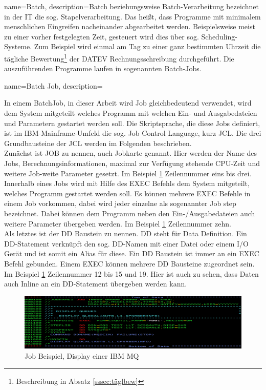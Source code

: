 \makeglossaries

{
	name=Batch,
	description={Batch beziehungsweise Batch-Verarbeitung bezeichnet in der IT die sog. \glqq Stapelverarbeitung\grqq.
Das heißt, dass Programme mit minimalem menschlichen Eingreifen nacheinander abgearbeitet werden.
Beispielsweise meist zu einer vorher festgelegten Zeit, gesteuert wird dies über sog. \glqq Scheduling\grqq-Systeme.
Zum Beispiel wird einmal am Tag zu einer ganz bestimmten Uhrzeit die tägliche Bewertung\footnote{Beschreibung in Absatz \ref{sssec:täglbew}} der DATEV Rechnungsschreibung durchgeführt.
Die auszuführenden Programme laufen in sogenannten \glqq Batch-Jobs\grqq.
\cite{Ebbers.2011}}
}

{
	name=Batch Job,
	description={In einem Batch\-Job, in dieser Arbeit wird \glqq Job\grqq{} gleichbedeutend verwendet, wird dem System mitgeteilt welches Programm mit welchen Ein- und Ausgabedateien und Parametern gestartet werden soll.
Die Skriptsprache, die diese Jobs definiert, ist im IBM-Mainframe-Umfeld die sog. \glqq Job Control Language\grqq, kurz JCL.
Die drei Grundbausteine der JCL werden im Folgenden beschrieben.\\
Zunächst ist \glqq JOB\grqq{} zu nennen, auch Jobkarte genannt.
Hier werden der Name des Jobs, Berechnungsinformationen, maximal zur Verfügung stehende CPU-Zeit und weitere Job-weite Parameter gesetzt.
Im Beispiel \ref{fig:jclBsp} Zeilennummer eins bis drei.\\
Innerhalb eines Jobs wird mit Hilfe des \glqq EXEC\grqq{} Befehls dem System mitgeteilt, welches Programm gestartet werden soll.
Es können mehrere \glqq EXEC\grqq{}  Befehle in einem Job vorkommen, dabei wird jeder einzelne als sogenannter \glqq Job step\grqq{} bezeichnet.
Dabei können dem Programm neben den Ein-/Ausgabedateien auch weitere Parameter übergeben werden.
Im Beispiel \ref{fig:jclBsp} Zeilennummer zehn.\\
Als letztes ist der \glqq DD\grqq{} Baustein zu nennen.
\glqq DD\grqq{} steht für Data Definition.
Ein DD-Statement verknüpft den sog. DD-Namen mit einer Datei oder einem I/O Gerät und ist somit ein Alias für diese.
Ein \glqq DD\grqq{} Baustein ist immer an ein \glqq EXEC\grqq{} Befehl gebunden.
Einem \glqq EXEC\grqq{} können mehrere \glqq DD\grqq{} Bausteine zugeordnet sein. 
Im Beispiel \ref{fig:jclBsp} Zeilennummer 12 bis 15 und 19.
Hier ist auch zu sehen, dass Daten auch Inline an ein DD-Statement übergeben werden kann.
\cite{Ebbers.2011}
\begin{figure}[h]
\centering
\includegraphics[width=\textwidth]{figures/dispq.PNG}
\caption{Job Beispiel, Display einer IBM MQ}
\label{fig:jclBsp}
\end{figure}}
}

